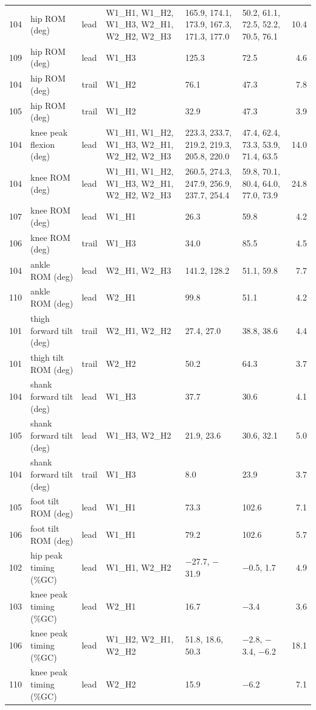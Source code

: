 \begin{longtable}{@{}r p{3.3cm} l p{2.9cm} p{3.0cm} p{3.0cm} r@{}}
104 & hip ROM (deg) & lead & W1\_H1, W1\_H2, W1\_H3, W2\_H1, W2\_H2, W2\_H3 & 165.9, 174.1, 173.9, 167.3, 171.3, 177.0 & 50.2, 61.1, 72.5, 52.2, 70.5, 76.1 & 10.4 \\
109 & hip ROM (deg) & lead & W1\_H3 & 125.3 & 72.5 & 4.6 \\
104 & hip ROM (deg) & trail & W1\_H2 & 76.1 & 47.3 & 7.8 \\
105 & hip ROM (deg) & trail & W1\_H2 & 32.9 & 47.3 & 3.9 \\
104 & knee peak flexion (deg) & lead & W1\_H1, W1\_H2, W1\_H3, W2\_H1, W2\_H2, W2\_H3 & 223.3, 233.7, 219.2, 219.3, 205.8, 220.0 & 47.4, 62.4, 73.3, 53.9, 71.4, 63.5 & 14.0 \\
104 & knee ROM (deg) & lead & W1\_H1, W1\_H2, W1\_H3, W2\_H1, W2\_H2, W2\_H3 & 260.5, 274.3, 247.9, 256.9, 237.7, 254.4 & 59.8, 70.1, 80.4, 64.0, 77.0, 73.9 & 24.8 \\
107 & knee ROM (deg) & lead & W1\_H1 & 26.3 & 59.8 & 4.2 \\
106 & knee ROM (deg) & trail & W1\_H3 & 34.0 & 85.5 & 4.5 \\
104 & ankle ROM (deg) & lead & W2\_H1, W2\_H3 & 141.2, 128.2 & 51.1, 59.8 & 7.7 \\
110 & ankle ROM (deg) & lead & W2\_H1 & 99.8 & 51.1 & 4.2 \\
101 & thigh forward tilt (deg) & trail & W2\_H1, W2\_H2 & 27.4, 27.0 & 38.8, 38.6 & 4.4 \\
101 & thigh tilt ROM (deg) & trail & W2\_H2 & 50.2 & 64.3 & 3.7 \\
104 & shank forward tilt (deg) & lead & W1\_H3 & 37.7 & 30.6 & 4.1 \\
105 & shank forward tilt (deg) & lead & W1\_H3, W2\_H2 & 21.9, 23.6 & 30.6, 32.1 & 5.0 \\
104 & shank forward tilt (deg) & trail & W1\_H3 & 8.0 & 23.9 & 3.7 \\
105 & foot tilt ROM (deg) & lead & W1\_H1 & 73.3 & 102.6 & 7.1 \\
106 & foot tilt ROM (deg) & lead & W1\_H1 & 79.2 & 102.6 & 5.7 \\
102 & hip peak timing (\%GC) & lead & W1\_H1, W2\_H2 & $-$27.7, $-$31.9 & $-$0.5, 1.7 & 4.9 \\
103 & knee peak timing (\%GC) & lead & W2\_H1 & 16.7 & $-$3.4 & 3.6 \\
106 & knee peak timing (\%GC) & lead & W1\_H2, W2\_H1, W2\_H2 & 51.8, 18.6, 50.3 & $-$2.8, $-$3.4, $-$6.2 & 18.1 \\
110 & knee peak timing (\%GC) & lead & W2\_H2 & 15.9 & $-$6.2 & 7.1 \\

\end{longtable}
